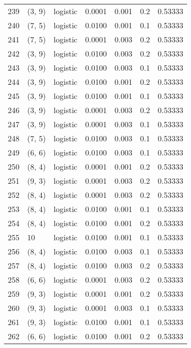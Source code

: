 \begin{tabular}{lllrrrr}
239 &      (3, 9) &  logistic &  0.0001 &  0.001 &  0.2 &   0.53333 \\
240 &      (7, 5) &  logistic &  0.0100 &  0.001 &  0.1 &   0.53333 \\
241 &      (7, 5) &  logistic &  0.0001 &  0.003 &  0.2 &   0.53333 \\
242 &      (3, 9) &  logistic &  0.0100 &  0.003 &  0.2 &   0.53333 \\
243 &      (3, 9) &  logistic &  0.0100 &  0.003 &  0.1 &   0.53333 \\
244 &      (3, 9) &  logistic &  0.0100 &  0.001 &  0.2 &   0.53333 \\
245 &      (3, 9) &  logistic &  0.0100 &  0.001 &  0.1 &   0.53333 \\
246 &      (3, 9) &  logistic &  0.0001 &  0.003 &  0.2 &   0.53333 \\
247 &      (3, 9) &  logistic &  0.0001 &  0.003 &  0.1 &   0.53333 \\
248 &      (7, 5) &  logistic &  0.0100 &  0.003 &  0.1 &   0.53333 \\
249 &      (6, 6) &  logistic &  0.0100 &  0.003 &  0.1 &   0.53333 \\
250 &      (8, 4) &  logistic &  0.0001 &  0.001 &  0.2 &   0.53333 \\
251 &      (9, 3) &  logistic &  0.0001 &  0.003 &  0.2 &   0.53333 \\
252 &      (8, 4) &  logistic &  0.0001 &  0.003 &  0.2 &   0.53333 \\
253 &      (8, 4) &  logistic &  0.0100 &  0.001 &  0.1 &   0.53333 \\
254 &      (8, 4) &  logistic &  0.0100 &  0.001 &  0.2 &   0.53333 \\
255 &          10 &  logistic &  0.0100 &  0.001 &  0.1 &   0.53333 \\
256 &      (8, 4) &  logistic &  0.0100 &  0.003 &  0.1 &   0.53333 \\
257 &      (8, 4) &  logistic &  0.0100 &  0.003 &  0.2 &   0.53333 \\
258 &      (6, 6) &  logistic &  0.0001 &  0.003 &  0.2 &   0.53333 \\
259 &      (9, 3) &  logistic &  0.0001 &  0.001 &  0.2 &   0.53333 \\
260 &      (9, 3) &  logistic &  0.0001 &  0.003 &  0.1 &   0.53333 \\
261 &      (9, 3) &  logistic &  0.0100 &  0.001 &  0.1 &   0.53333 \\
262 &      (6, 6) &  logistic &  0.0100 &  0.001 &  0.2 &   0.53333 \\

\end{tabular}
